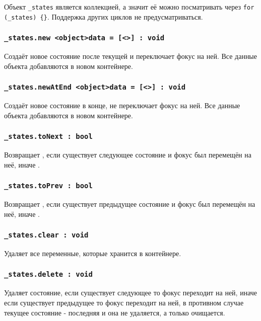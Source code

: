 Объект \lstinline|_states| является коллекцией, а значит её можно посматривать через \lstinline|for (_states) {}|. Поддержка других циклов не предусматриваться.

\subsubsection{\lstinline|_states.new <object>data = [<>] : void|}

Создаёт новое состояние после текущей и переключает фокус на ней. Все данные объекта  добавляются в новом контейнере.

\subsubsection{\lstinline|_states.newAtEnd <object>data = [<>] : void|}

Создаёт новое состояние в конце, не переключает фокус на ней. Все данные объекта  добавляются в новом контейнере.

\subsubsection{\lstinline|_states.toNext : bool|}

Возвращает \true, если существует следующее состояние и фокус был перемещён на неё, иначе \false.

\subsubsection{\lstinline|_states.toPrev : bool|}

Возвращает \true, если существует предыдущее состояние и фокус был перемещён на неё, иначе \false.

\subsubsection{\lstinline|_states.clear : void|}

Удаляет все переменные, которые хранится в контейнере.

\subsubsection{\lstinline|_states.delete : void|}

Удаляет состояние, если существует следующее то фокус переходит на ней, иначе если существует предыдущее то фокус переходит на ней, в противном случае текущее состояние - последняя и она не удаляется, а только очищается.

